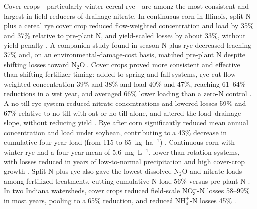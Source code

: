 Cover crops---particularly winter cereal rye---are among the most consistent and largest in-field reducers of drainage nitrate. In continuous corn in Illinois, split N plus a cereal rye cover crop reduced flow-weighted concentration and load by 35\% and 37\% relative to pre-plant N, and yield-scaled losses by about 33\%, without yield penalty \parencite{PrezaFontes2021}. A companion study found in-season N plus rye decreased leaching 37\% and, on an environmental-damage-cost basis, matched pre-plant N despite shifting losses toward N$_2$O \parencite{PrezaFontes2023}. Cover crops proved more consistent and effective than shifting fertilizer timing: added to spring and fall systems, rye cut flow-weighted concentration 39\% and 38\% and load 40\% and 47\%, reaching 61--64\% reductions in a wet year, and averaged 66\% lower loading than a zero-N control \parencite{Ruffatti2019}. A no-till rye system reduced nitrate concentrations and lowered losses 59\% and 67\% relative to no-till with oat or no-till alone, and altered the load--drainage slope, without reducing yield \parencite{OBrien2022}. Rye after corn significantly reduced mean annual concentration and load under soybean, contributing to a 43\% decrease in cumulative four-year load (from 115 to 65~kg~ha$^{-1}$) \parencite{Gentry2024}. Continuous corn with winter rye had a four-year mean of 5.6~mg~L$^{-1}$, lower than rotation systems, with losses reduced in years of low-to-normal precipitation and high cover-crop growth \parencite{Daigh2015b}. Split N plus rye also gave the lowest dissolved N$_2$O and nitrate loads among fertilized treatments, cutting cumulative N load 56\% versus pre-plant N \parencite{Oliveira2025}. In two Indiana watersheds, cover crops reduced field-scale NO$_3^-$-N losses 58--99\% in most years, pooling to a 65\% reduction, and reduced NH$_4^+$-N losses 45\% \parencite{Vincent2025}.

